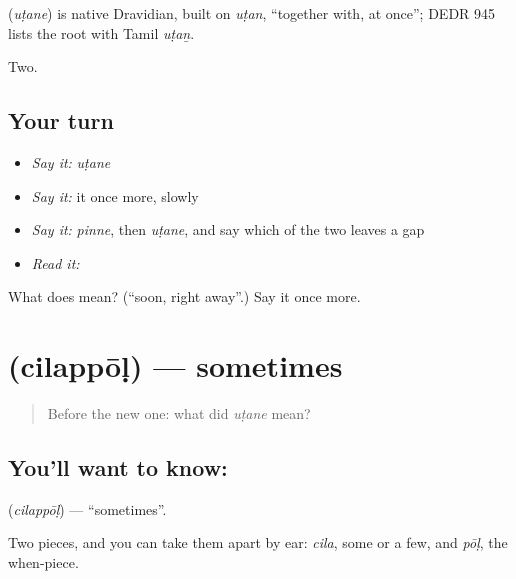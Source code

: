 \begin{cousinweb}
\textbf{} (\emph{uṭane}) is native Dravidian, built on \emph{uṭan}, \textquotedblleft{}together with, at once\textquotedblright{}; DEDR 945 lists the root with Tamil \emph{uṭaṉ}.
\end{cousinweb}

\begin{grammarlens}[title={What you've built}]
Two.
\end{grammarlens}

\subsection*{Your turn}
\begin{itemize}
\raggedright
  \item \emph{Say it:} \emph{uṭane}
  \item \emph{Say it:} it once more, slowly
  \item \emph{Say it:} \emph{pinne}, then \emph{uṭane}, and say which of the two leaves a gap
  \item \emph{Read it:} \textbf{}
\end{itemize}

\begin{tcolorbox}[breakable,colback=teal!4,colframe=teal!35!black,title={Before you move on}]
What does  mean? (\textquotedblleft{}soon, right away\textquotedblright{}.) Say it once more.
\end{tcolorbox}
\section[\texorpdfstring{\ml{ചിലപ്പോൾ} (cilappōḷ)}{ചിലപ്പോൾ (cilappōḷ)}]{ (cilappōḷ) — sometimes}

\label{lesson:ML-C64-sometimes}



\begin{quote}
Before the new one: what did \emph{uṭane} mean?
\end{quote}

\subsection*{You'll want to know: }
\textbf{} (\emph{cilappōḷ}) — \textquotedblleft{}sometimes\textquotedblright{}.

Two pieces, and you can take them apart by ear: \emph{cila}, some or a few, and \emph{pōḷ}, the when-piece.

